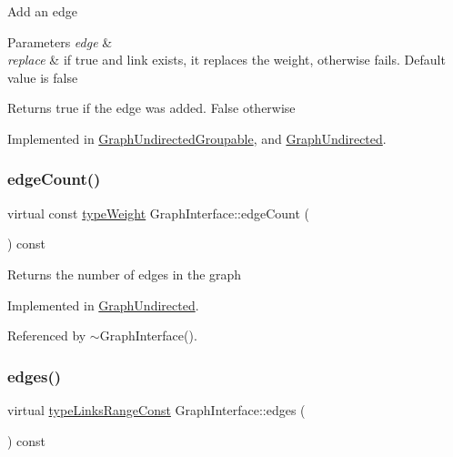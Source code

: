 Add an edge


\begin{DoxyParams}{Parameters}
{\em edge} & \\
\hline
{\em replace} & if true and link exists, it replaces the weight, otherwise fails. Default value is false \\
\hline
\end{DoxyParams}
\begin{DoxyReturn}{Returns}
true if the edge was added. False otherwise 
\end{DoxyReturn}


Implemented in \hyperlink{classGraphUndirectedGroupable_a2efe963916349ac6615721ab85a93ceb}{Graph\+Undirected\+Groupable}, and \hyperlink{classGraphUndirected_a366c8b7dbf1cbfe408d5399ad64494dc}{Graph\+Undirected}.

\mbox{\label{classGraphInterface_a057eb801c6d7f594cdedc205a0d081a9}} 
\subsubsection{\texorpdfstring{edge\+Count()}{edgeCount()}}
{\footnotesize\ttfamily virtual const \hyperlink{edge_8h_a2e7ea3be891ac8b52f749ec73fee6dd2}{type\+Weight} Graph\+Interface\+::edge\+Count (\begin{DoxyParamCaption}{ }\end{DoxyParamCaption}) const\hspace{0.3cm}{\ttfamily [pure virtual]}}

\begin{DoxyReturn}{Returns}
the number of edges in the graph 
\end{DoxyReturn}


Implemented in \hyperlink{classGraphUndirected_acc533831ee3234a03a1cc0037b017a83}{Graph\+Undirected}.



Referenced by $\sim$\+Graph\+Interface().

\mbox{\label{classGraphInterface_a2ac54d73e88516d6793a9a6fc0e434ee}} 
\subsubsection{\texorpdfstring{edges()}{edges()}}
{\footnotesize\ttfamily virtual \hyperlink{graphInterface_8h_ae8d27008f15586bbf419af7ad2e0a48a}{type\+Links\+Range\+Const} Graph\+Interface\+::edges (\begin{DoxyParamCaption}{ }\end{DoxyParamCaption}) const\hspace{0.3cm}{\ttfamily [pure virtual]}}

